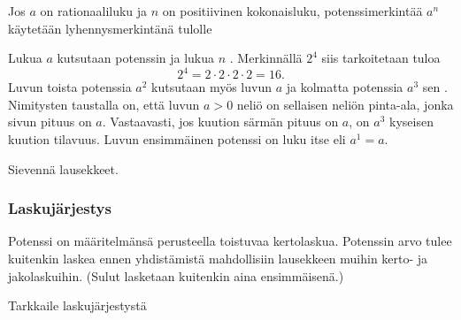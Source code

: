 Jos $a$ on rationaaliluku ja $n$ on positiivinen kokonaisluku, potenssimerkintää $a^n$ käytetään lyhennysmerkintänä tulolle
   
\laatikko[Potenssi]{    \[
        a^n = \underbrace{a\cdot \ldots \cdot a}_{n\text{ kpl}}. 
    \]}
    
Lukua $a$ kutsutaan potenssin  ja lukua $n$ . Merkinnällä $2^4$ siis tarkoitetaan tuloa 
        \[
            2^4=2\cdot 2\cdot 2\cdot 2=16.
        \]
Luvun toista potenssia $a^2$ kutsutaan myös luvun $a$  ja kolmatta potenssia $a^3$ sen . Nimitysten taustalla on, että luvun $a>0$ neliö on sellaisen neliön pinta-ala, jonka sivun pituus on $a$. Vastaavasti, jos kuution särmän pituus on $a$, on $a^3$ kyseisen kuution tilavuus. Luvun ensimmäinen potenssi on luku itse eli $a^1 = a$.

\begin{esimerkki}
Sievennä lausekkeet.
	\begin{esimratk}
	
	\end{esimratk}
	
	\begin{esimvast}
	\end{esimvast}	

\end{esimerkki}


\subsubsection*{Laskujärjestys} %

Potenssi on määritelmänsä perusteella toistuvaa kertolaskua. Potenssin arvo tulee kuitenkin laskea ennen yhdistämistä mahdollisiin lausekkeen muihin kerto- ja jakolaskuihin. (Sulut lasketaan kuitenkin aina ensimmäisenä.)

    \begin{esimerkki}
      Tarkkaile laskujärjestystä
    \end{esimerkki}  

